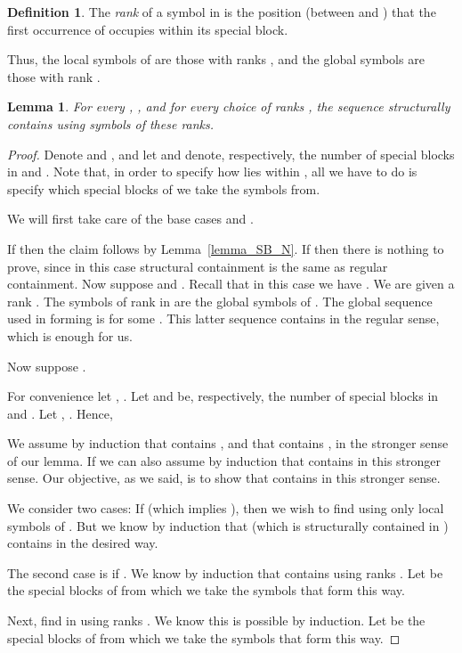 \documentclass[11pt]{article}
\newtheorem{lemma}[theorem]{Lemma}
\theoremstyle{definition}
\newtheorem{definition}[theorem]{Definition}
\theoremstyle{remark}
\begin{document}
\begin{definition}\label{def_rank}
The \emph{rank} of a symbol  in  is the position (between  and ) that the first occurrence of  occupies within its special block.
\end{definition}

Thus, the local symbols of  are those with ranks , and the global symbols are those with rank .

\begin{lemma}\label{lem_structurally}
For every , , and for every choice of  ranks , the sequence  structurally contains  using symbols of these ranks.
\end{lemma}

\begin{proof}
Denote  and , and let  and  denote, respectively, the number of special blocks in  and . Note that, in order to specify how  lies within , all we have to do is specify which  special blocks  of  we take the symbols from.

We will first take care of the base cases  and .

If  then the claim follows by Lemma~\ref{lemma_SB_N}. If  then there is nothing to prove, since in this case structural containment is the same as regular containment. Now suppose  and . Recall that in this case we have . We are given a rank . The symbols of rank  in  are the global symbols of . The global sequence used in forming  is  for some . This latter sequence contains  in the regular sense, which is enough for us.

Now suppose .

For convenience let , . Let  and  be, respectively, the number of special blocks in  and . Let , . Hence,


We assume by induction that  contains , and that  contains , in the stronger sense of our lemma. If  we can also assume by induction that  contains  in this stronger sense. Our objective, as we said, is to show that  contains  in this stronger sense.

We consider two cases: If  (which implies ), then we wish to find  using only local symbols of . But we know by induction that  (which is structurally contained in ) contains  in the desired way.

The second case is if . We know by induction that  contains  using ranks . Let  be the special blocks of  from which we take the symbols that form  this way.

Next, find  in  using ranks . We know this is possible by induction. Let  be the special blocks of  from which we take the symbols that form  this way.


\end{proof}
\end{document}
